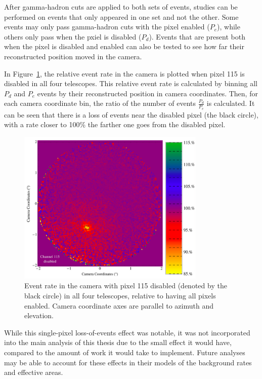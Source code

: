     After gamma-hadron cuts are applied to both sets of events, studies can be performed on events that only appeared in one set and not the other.
    Some events may only pass gamma-hadron cuts with the pixel enabled ($P_e$), while others only pass when the pxiel is disabled ($P_d$).
    Events that are present both when the pixel is disabled and enabled can also be tested to see how far their reconstructed position moved in the camera.

    In Figure~\ref{fig:dpix_rel_camera}, the relative event rate in the camera is plotted when pixel 115 is disabled in all four telescopes.
    This relative event rate is calculated by binning all $P_d$ and $P_e$ events by their reconstructed position in camera coordinates.
    Then, for each camera coordinate bin, the ratio of the number of events $\frac{P_d}{P_e}$ is calculated.
    It can be seen that there is a loss of events near the disabled pixel (the black circle), with a rate closer to 100\% the farther one goes from the disabled pixel.

    \begin{figure}[ht]
      \centering
      \includegraphics[width=0.8\textwidth]{images/disabled_pixel/relativerate_camera}
      \caption[Relative Event Rate]{
        Event rate in the camera with pixel 115 disabled (denoted by the black circle) in all four telescopes, relative to having all pixels enabled.
        Camera coordinate axes are parallel to azimuth and elevation.
      }
      \label{fig:dpix_rel_camera}
    \end{figure}
    
    While this single-pixel loss-of-events effect was notable, it was not incorporated into the main analysis of this thesis due to the small effect it would have, compared to the amount of work it would take to implement.
    Future analyses may be able to account for these effects in their models of the background rates and effective areas.
    
